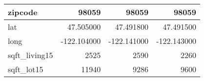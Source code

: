 \begin{table}[H]
\begin{tabular}{|l|r|r|r|}
\hline zipcode & \cellcolor[rgb]{0.9, 0.54, 0.52} 98059 & \cellcolor[rgb]{0.9, 0.54, 0.52} 98059 & \cellcolor[rgb]{0.9, 0.54, 0.52} 98059 \\
\hline lat & \cellcolor[rgb]{0.9, 0.54, 0.52} 47.505000 & 47.491800 & 47.491500 \\
\hline long & \cellcolor[rgb]{0.9, 0.54, 0.52} -122.104000 & \cellcolor[rgb]{0.9, 0.54, 0.52} -122.141000 & \cellcolor[rgb]{0.9, 0.54, 0.52} -122.143000 \\
\hline sqft\_living15 & \cellcolor[rgb]{0.9, 0.54, 0.52} 2525 & 2590 & 2260 \\
\hline sqft\_lot15 & \cellcolor[rgb]{0.9, 0.54, 0.52} 11940 & 9286 & 9600 \\
\hline
\end{tabular}
\end{table}
